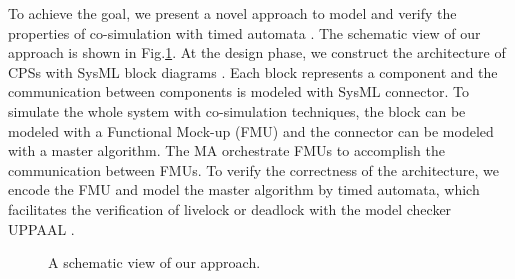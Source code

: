 To achieve the goal, we present a novel approach to model and verify the properties of co-simulation with timed automata \cite{AlurD94}. The schematic view of our approach is shown in Fig.\ref{paper-arc}. At the design phase, we construct the architecture of CPSs with SysML block diagrams \cite{RahimHI17}. Each block represents a component and the communication between components is modeled with SysML connector. To simulate the whole system with co-simulation techniques, the block can be modeled with a Functional Mock-up (FMU) and the connector can be modeled with a master algorithm. The MA orchestrate FMUs to accomplish the communication between FMUs. To verify the correctness of the architecture, we encode the FMU and model the master algorithm by timed automata, which facilitates the verification of livelock or deadlock with the model checker UPPAAL \cite{BehrmannDLHPYH06}.
\begin{figure}[htbp]
	\caption{A schematic view of our approach.}
	\label{paper-arc}
\end{figure}


